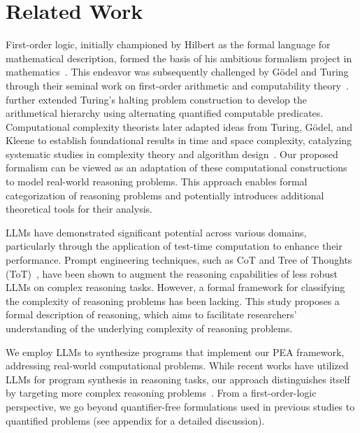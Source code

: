 \section{Related Work}
First-order logic, initially championed by Hilbert as the formal language for mathematical description, formed the basis of his ambitious formalism project in mathematics~\citep{Hilbert1926}. This endeavor was subsequently challenged by Gödel and Turing through their seminal work on first-order arithmetic and computability theory~\citep{Goedel1931,turing1936computable}.~\citet{Kleene-recursive} further extended Turing's halting problem construction to develop the arithmetical hierarchy using alternating quantified computable predicates. Computational complexity theorists later adapted ideas from Turing, Gödel, and Kleene to establish foundational results in time and space complexity, catalyzing systematic studies in complexity theory and algorithm design~\citep{arora_complexity,algo}. Our proposed formalism can be viewed as an adaptation of these computational constructions to model real-world reasoning problems. This approach enables formal categorization of reasoning problems and potentially introduces additional theoretical tools for their analysis.

LLMs have demonstrated significant potential across various domains, particularly through the application of test-time computation to enhance their performance. Prompt engineering techniques, such as CoT and Tree of Thoughts (ToT)~\citep{wei2022chain,yao2023tree}, have been shown to augment the reasoning capabilities of less robust LLMs on complex reasoning tasks. However, a formal framework for
classifying
the complexity of reasoning problems has been lacking. This study proposes a formal description of reasoning, which aims to facilitate researchers' understanding of the underlying complexity of reasoning problems.

We employ LLMs to synthesize programs that implement our PEA framework, addressing real-world computational problems. While recent works have utilized LLMs for program synthesis in reasoning tasks, our approach distinguishes itself by targeting more complex reasoning problems~\citep{pal,weir2024learning}. From a first-order-logic perspective, we 
go beyond quantifier-free formulations used in
previous studies to quantified problems (see appendix for a detailed discussion).

